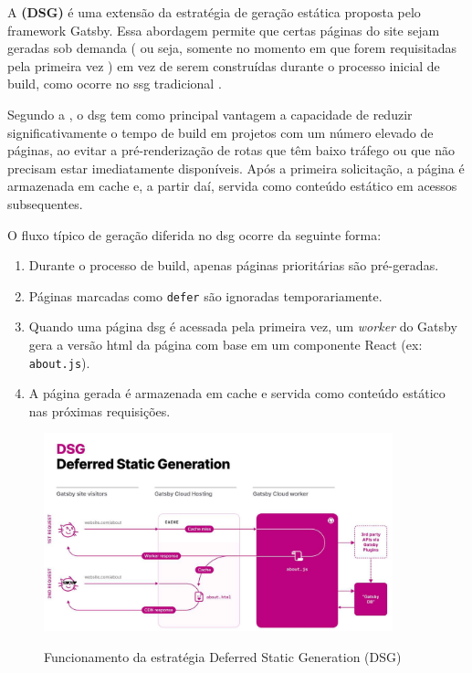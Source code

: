A \textbf{ (DSG)} é uma extensão da estratégia de geração estática proposta pelo framework Gatsby. Essa abordagem permite que certas páginas do site sejam geradas sob demanda ( ou seja, somente no momento em que forem requisitadas pela primeira vez ) em vez de serem construídas durante o processo inicial de build, como ocorre no \acrshort{ssg} tradicional \cite{gatsby2023}.

Segundo a , o \acrshort{dsg} tem como principal vantagem a capacidade de reduzir significativamente o tempo de build em projetos com um número elevado de páginas, ao evitar a pré-renderização de rotas que têm baixo tráfego ou que não precisam estar imediatamente disponíveis. Após a primeira solicitação, a página é armazenada em cache e, a partir daí, servida como conteúdo estático em acessos subsequentes.

O fluxo típico de geração diferida no \acrshort{dsg} ocorre da seguinte forma:

\begin{enumerate}
    \item Durante o processo de build, apenas páginas prioritárias são pré-geradas.
    \item Páginas marcadas como \texttt{defer} são ignoradas temporariamente.
    \item Quando uma página \acrshort{dsg} é acessada pela primeira vez, um \textit{worker} do Gatsby gera a versão \acrshort{html} da página com base em um componente React (ex: \texttt{about.js}).
    \item A página gerada é armazenada em cache e servida como conteúdo estático nas próximas requisições.
\end{enumerate}

\begin{figure}[H]
  \centering
  \caption{Funcionamento da estratégia Deferred Static Generation (DSG)}
  \includegraphics[width=0.9\textwidth]{media/deferred_static_generation_dsg.png}
  \label{fig:deferred_dsg}
\end{figure}

